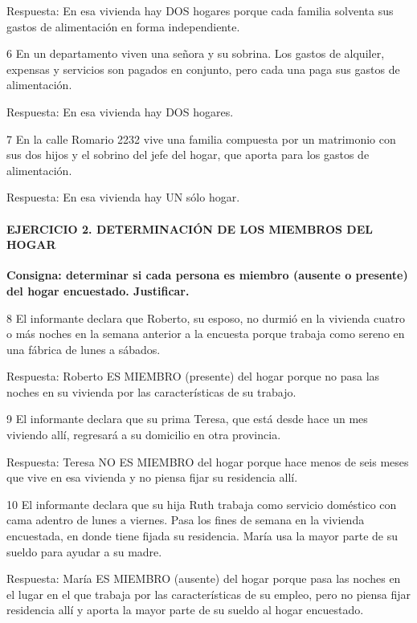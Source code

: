 \documentclass[
  openany]{book}
\begin{document}
Respuesta: En esa vivienda hay DOS hogares porque cada familia solventa sus gastos de alimentación en forma independiente.

6 En un departamento viven una señora y su sobrina. Los gastos de alquiler, expensas y servicios son pagados en conjunto, pero cada una paga sus gastos de alimentación.

Respuesta: En esa vivienda hay DOS hogares.

7 En la calle Romario 2232 vive una familia compuesta por un matrimonio con sus dos hijos y el sobrino del jefe del hogar, que aporta para los gastos de alimentación.

Respuesta: En esa vivienda hay UN sólo hogar.

\hypertarget{ejercicio-2.-determinaciuxf3n-de-los-miembros-del-hogar-1}{%
\paragraph{\texorpdfstring{\textbf{EJERCICIO 2. DETERMINACIÓN DE LOS MIEMBROS DEL HOGAR}}{EJERCICIO 2. DETERMINACIÓN DE LOS MIEMBROS DEL HOGAR}}\label{ejercicio-2.-determinaciuxf3n-de-los-miembros-del-hogar-1}}

\textbf{Consigna: determinar si cada persona es miembro (ausente o presente) del hogar encuestado. Justificar.}

8 El informante declara que Roberto, su esposo, no durmió en la vivienda cuatro o más noches en la semana anterior a la encuesta porque trabaja como sereno en una fábrica de lunes a sábados.

Respuesta: Roberto ES MIEMBRO (presente) del hogar porque no pasa las noches en su vivienda por las características de su trabajo.

9 El informante declara que su prima Teresa, que está desde hace un mes viviendo allí, regresará a su domicilio en otra provincia.

Respuesta: Teresa NO ES MIEMBRO del hogar porque hace menos de seis meses que vive en esa vivienda y no piensa fijar su residencia allí.

10 El informante declara que su hija Ruth trabaja como servicio doméstico con cama adentro de lunes a viernes. Pasa los fines de semana en la vivienda encuestada, en donde tiene fijada su residencia. María usa la mayor parte de su sueldo para ayudar a su madre.

Respuesta: María ES MIEMBRO (ausente) del hogar porque pasa las noches en el lugar en el que trabaja por las características de su empleo, pero no piensa fijar residencia allí y aporta la mayor parte de su sueldo al hogar encuestado.
\end{document}
